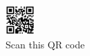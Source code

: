 \begin{figure}[h]
    \centering
    \includegraphics[width=0.1\textwidth]{images/portfolio.png}
    \caption*{Scan this QR code}
    \label{fig:figure3}
\end{figure}